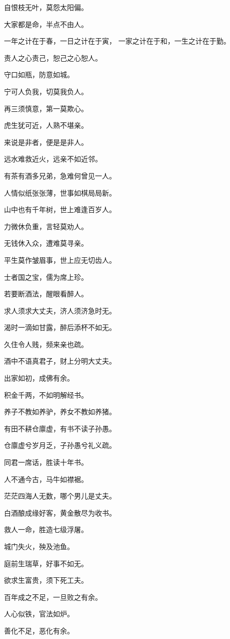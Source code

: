 \documentclass[12pt,oneside]{book}
\begin{document}
自恨枝无叶，莫怨太阳偏。

大家都是命，半点不由人。

一年之计在于春，一日之计在于寅， 一家之计在于和，一生之计在于勤。

责人之心责己，恕己之心恕人。

守口如瓶，防意如城。

宁可人负我，切莫我负人。

再三须慎意，第一莫欺心。

虎生犹可近，人熟不堪亲。

来说是非者，便是是非人。

远水难救近火，远亲不如近邻。

有茶有酒多兄弟，急难何曾见一人。

人情似纸张张薄，世事如棋局局新。

山中也有千年树，世上难逢百岁人。

力微休负重，言轻莫劝人。

无钱休入众，遭难莫寻亲。

平生莫作皱眉事，世上应无切齿人。

士者国之宝，儒为席上珍。

若要断酒法，醒眼看醉人。

求人须求大丈夫，济人须济急时无。

渴时一滴如甘露，醉后添杯不如无。

久住令人贱，频来亲也疏。

酒中不语真君子，财上分明大丈夫。

出家如初，成佛有余。

积金千两，不如明解经书。

养子不教如养驴，养女不教如养猪。

有田不耕仓廪虚，有书不读子孙愚。

仓廪虚兮岁月乏，子孙愚兮礼义疏。

同君一席话，胜读十年书。

人不通今古，马牛如襟裾。

茫茫四海人无数，哪个男儿是丈夫。

白酒酿成缘好客，黄金散尽为收书。

救人一命，胜造七级浮屠。

城门失火，殃及池鱼。

庭前生瑞草，好事不如无。

欲求生富贵，须下死工夫。

百年成之不足，一旦败之有余。

人心似铁，官法如炉。

善化不足，恶化有余。
\end{document}
